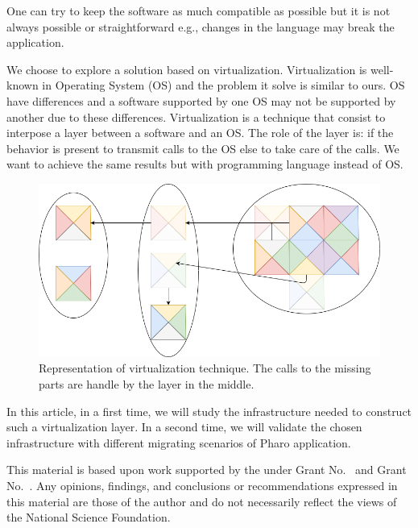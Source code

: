 \documentclass[sigplan,review,anonymous]{acmart}\settopmatter{printfolios=true,printccs=false,printacmref=false}
\begin{document}
One can try to keep the software as much compatible as possible but it is not always possible or straightforward e.g., changes in the language may break the application.

We choose to explore a solution based on virtualization.
Virtualization is well-known in Operating System (OS) and the problem it solve is similar to ours.
OS have differences and a software supported by one OS may not be supported by another due to these differences.
Virtualization is a technique that consist to interpose a layer between a software and an OS.
The role of the layer is: if the behavior is present to transmit calls to the OS else to take care of the calls.
We want to achieve the same results but with programming language instead of OS. 
	\begin{figure}[H]
       \centering
       \includegraphics[scale=0.25]{Images/VirtualisationIdea.png}
        \caption{Representation of virtualization technique. The calls to the missing parts are handle by the layer in the middle.}
	\end{figure}
	
In this article, in a first time, we will study the infrastructure needed to construct such a virtualization layer.
In a second time, we will validate the chosen infrastructure with different migrating scenarios of Pharo application.



\begin{acks}                            %
  This material is based upon work supported by the
   under Grant
  No.~ and Grant
  No.~.  Any opinions, findings, and
  conclusions or recommendations expressed in this material are those
  of the author and do not necessarily reflect the views of the
  National Science Foundation.
\end{acks}
\end{document}
